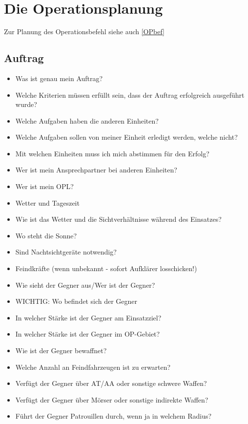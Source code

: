 \newpage

\section{Die Operationsplanung}
\label{OPpla}

Zur Planung des Operationsbefehl siehe auch \ref{OPbef} 

\subsection{Auftrag}
	\begin{itemize}
		\item Was ist genau mein Auftrag?
		\item Welche Kriterien müssen erfüllt sein, dass der Auftrag erfolgreich ausgeführt wurde?
		\item Welche Aufgaben haben die anderen Einheiten?
		\item Welche Aufgaben sollen von meiner Einheit erledigt werden, welche nicht?
		\item Mit welchen Einheiten muss ich mich abstimmen für den Erfolg?
		\item Wer ist mein Ansprechpartner bei anderen Einheiten?
		\item Wer ist mein OPL?
		\item Wetter und Tageszeit
		\item Wie ist das Wetter und die Sichtverhältnisse während des Einsatzes?
		\item Wo steht die Sonne?
		\item Sind Nachtsichtgeräte notwendig?
		\item Feindkräfte (wenn unbekannt - sofort Aufklärer losschicken!)
		\item Wie sieht der Gegner aus/Wer ist der Gegner?
		\item WICHTIG: Wo befindet sich der Gegner
		\item In welcher Stärke ist der Gegner am Einsatzziel?
		\item In welcher Stärke ist der Gegner im OP-Gebiet?
		\item Wie ist der Gegner bewaffnet?
		\item Welche Anzahl an Feindfahrzeugen ist zu erwarten?
		\item Verfügt der Gegner über AT/AA oder sonstige schwere Waffen?	
		\item Verfügt der Gegner über Mörser oder sonstige indirekte Waffen?
		\item Führt der Gegner Patrouillen durch, wenn ja in welchem Radius?
	\end{itemize}

